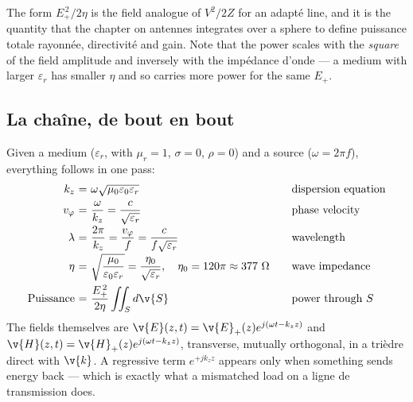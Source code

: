 \begin{remark}
  The form $E_+^{\,2}/2\eta$ is the field analogue of $V^2/2Z$ for an adapté
  line, and it is the quantity that the chapter on antennes integrates over a
  sphere to define puissance totale rayonnée, directivité and gain. Note that
  the power scales with the \emph{square} of the field amplitude and inversely
  with the impédance d'onde --- a medium with larger $\varepsilon_r$ has
  smaller $\eta$ and so carries more power for the same $E_+$.
\end{remark}

\subsection{La chaîne, de bout en bout}

\begin{conclusion}
  Given a medium ($\varepsilon_r$, with $\mu_r = 1$, $\sigma = 0$, $\rho = 0$)
  and a source ($\omega = 2\pi f$), everything follows in one pass:
  \[
    \begin{array}{r@{\ }c@{\ }l@{\qquad}l}
      k_z &=& \omega\sqrt{\mu_0\varepsilon_0\varepsilon_r}
        & \text{dispersion equation} \\[4pt]
      v_\varphi &=& \dfrac{\omega}{k_z} = \dfrac{c}{\sqrt{\varepsilon_r}}
        & \text{phase velocity} \\[8pt]
      \lambda &=& \dfrac{2\pi}{k_z} = \dfrac{v_\varphi}{f}
                = \dfrac{c}{f\sqrt{\varepsilon_r}}
        & \text{wavelength} \\[8pt]
      \eta &=& \sqrt{\dfrac{\mu_0}{\varepsilon_0\varepsilon_r}}
             = \dfrac{\eta_0}{\sqrt{\varepsilon_r}},
             \quad \eta_0 = 120\pi \approx 377\ \Omega
        & \text{wave impedance} \\[10pt]
      \text{Puissance} &=& \dfrac{E_+^{\,2}}{2\eta}\displaystyle\iint_S d\v{S}
        & \text{power through } S
    \end{array}
  \]
  The fields themselves are $\v{E}(z,t) = \v{E}_+(z)e^{j(\omega t - k_z z)}$
  and $\v{H}(z,t) = \v{H}_+(z)e^{j(\omega t - k_z z)}$, transverse, mutually
  orthogonal, in a trièdre direct with $\v{k}$. A regressive term
  $e^{+jk_z z}$ appears only when something sends energy back --- which is
  exactly what a mismatched load on a ligne de transmission does.
\end{conclusion}
